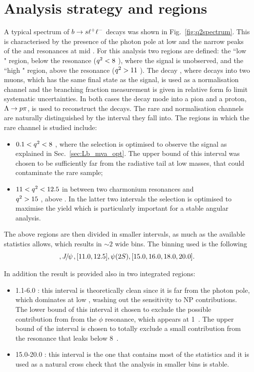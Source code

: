 \section{Analysis strategy and \qsq regions}
\label{sec:Lb_q2choice}

A typical \qsq spectrum of ${b}\rightarrow{\ensuremath{s}}\ell^+ \ell^-$ decays was shown in Fig.~\ref{fig:q2spectrum}.
This is characterised by the presence of the photon pole at low \qsq and the narrow peaks of the \jpsi and \psitwos resonances at mid \qsq.
For this analysis two regions are defined: the ``low \qsq" region, below the \jpsi resonance (${q^2} < 8$ \gevgevcccc),
where the signal is unobserved, and the ``high \qsq" region, above the \jpsi resonance (${q^2} > 11$ \gevgevcccc).
The decay \Lb\to\jpsi\Lz, where \jpsi decays into two muons, which has the same final state as the signal,
is used as a normalisation channel and the branching fraction measurement is given in relative form
fo limit systematic uncertainties. In both cases the \Lz decay mode into a pion and a proton, $\Lz\to p\pi$,
is used to reconstruct the decays. The rare and normalisation channels are naturally distinguished
by the \qsq interval they fall into. The regions in which the rare channel is studied include:
\begin{itemize}
\item $0.1 < {q^2} < 8$ \gevgevcccc, where the selection is optimised to observe the signal as explained in Sec.~\ref{sec:Lb_mva_opt}.
The upper bound of this interval was chosen to be sufficiently far from the \jpsi radiative tail at low masses, that
could contaminate the rare sample;
\item  $11 < {q^2} < 12.5$ \gevgevcccc in between two charmonium resonances and \\${q^2}>15$ \gevgevcccc, above \psitwos.
In the latter two intervals the selection is optimised to maximise the yield which is particularly important
for a stable angular analysis.
\end{itemize}
The above regions are then divided in smaller intervals, as much as the available statistics allows, which results
in $\sim 2$ \gevgevcccc wide bins. The binning used is the following 
\begin{equation}
[0.1, 2.0, 4.0, 6.0, 8.0], \jpsi, [11.0, 12.5], \psitwos, [15.0, 16.0, 18.0, 20.0].
\end{equation}

In addition the result is provided also in two integrated regions:
\begin{itemize}
\item 1.1-6.0 \gevgevcccc: this interval is theoretically clean since it is far from the
photon pole, which dominates at low \qsq, washing out the sensitivity to NP contributions.
The lower bound of this interval it chosen to exclude the possible contribution from
from the $\phi$ resonance, which appears at 1~\gevgevcccc. The upper bound of the interval
is chosen to totally exclude a small contribution from the \jpsi resonance that leaks
below 8~\gevgevcccc.
\item 15.0-20.0 \gevgevcccc: this interval is the one that contains most of the
statistics and it is used as a natural cross check that the analysis in smaller bins is stable.
\end{itemize}

